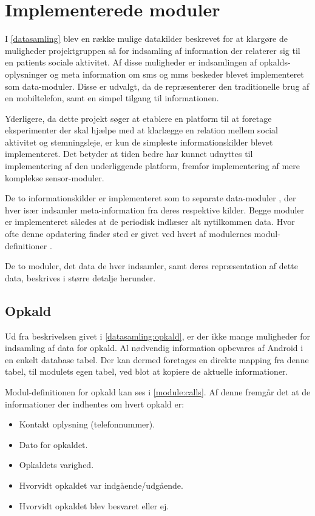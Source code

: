\chapter{Implementerede moduler}\label{implementerede_moduler}
I \cref{datasamling} blev en række mulige datakilder beskrevet for at klargøre de muligheder projektgruppen så for indsamling af information der relaterer sig til en patients sociale aktivitet.
Af disse muligheder er indsamlingen af opkalds-oplysninger og meta information om sms og mms beskeder blevet implementeret som data-moduler.
Disse er udvalgt, da de repræsenterer den traditionelle brug af en mobiltelefon, samt en simpel tilgang til informationen.

Yderligere, da dette projekt søger at etablere en platform til at foretage eksperimenter der skal hjælpe med at klarlægge en relation mellem social aktivitet og stemningsleje, er kun de simpleste informationskilder blevet implementeret.
Det betyder at tiden bedre har kunnet udnyttes til implementering af den underliggende platform, fremfor implementering af mere komplekse sensor-moduler.

De to informationskilder er implementeret som to separate data-moduler , der hver især indsamler meta-information fra deres respektive kilder.
Begge moduler er implementeret således at de periodisk indlæser alt nytilkommen data.
Hvor ofte denne opdatering finder sted er givet ved hvert af modulernes modul-definitioner .

De to moduler, det data de hver indsamler, samt deres repræsentation af dette data, beskrives i større detalje herunder.

\section{Opkald}\label{implementerede_moduler:opkald}
Ud fra beskrivelsen givet i \cref{datasamling:opkald}, er der ikke mange muligheder for indsamling af data for opkald.
Al nødvendig information opbevares af Android i en enkelt database tabel.
Der kan dermed foretages en direkte mapping fra denne tabel, til modulets egen tabel, ved blot at kopiere de aktuelle informationer.

Modul-definitionen for opkald kan ses i \cref{module:calls}.
Af denne fremgår det at de informationer der indhentes om hvert opkald er:
\begin{itemize}
\item Kontakt oplysning (telefonnummer).
\item Dato for opkaldet.
\item Opkaldets varighed.
\item Hvorvidt opkaldet var indgående/udgående.
\item Hvorvidt opkaldet blev besvaret eller ej.
\end{itemize}

